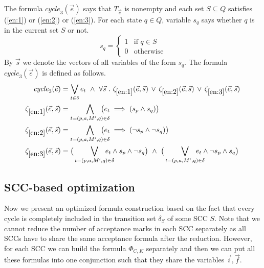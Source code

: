 \documentclass[a4paper,UKenglish,cleveref, autoref, thm-restate]{lipics-v2021}
\newcommand{\mcycle}{\mathit{cycle}}
\newcommand{\Te}{T_{\vec{e}}}
\begin{document}
The formula $\mcycle_3(\vec{e})$ says that $\Te$ is nonempty and each
set $S\subseteq Q$ satisfies (\ref{en:1}) or (\ref{en:2}) or
(\ref{en:3}).  For each state $q\in Q$, variable $s_q$ says whether
$q$ is in the current set $S$ or not.
\[s_q=\left\{
    \begin{array}{ll}
      1 & \textrm{if }q\in S\\
      0 & \textrm{otherwise}    
    \end{array}\right.
\]
By $\vec{s}$ we denote the vectors of all variables of the form $s_q$.
The formula $\mcycle_3(\vec{e})$ is defined as follows.
\begin{align*}
  \mcycle_3(\vec{e})
  &=\bigvee_{t\in\delta}e_t~\wedge~\forall\vec{s}~.~\zeta_{\ref{en:1}}(\vec{e},\vec{s})\,\vee\,
    \zeta_{\ref{en:2}}(\vec{e},\vec{s})\,\vee\,
    \zeta_{\ref{en:3}}(\vec{e},\vec{s})\\ %
  \zeta_{\ref{en:1}}(\vec{e},\vec{s}) &= \bigwedge_{t=(p,a,M',q)\in\delta}\hspace{-5mm}\big(e_t\implies (s_p\wedge s_q)\big)\\
  \zeta_{\ref{en:2}}(\vec{e},\vec{s}) &= \bigwedge_{t=(p,a,M',q)\in\delta}\hspace{-5mm}\big(e_t\implies (\neg s_p\wedge \neg s_q)\big)\\
  \zeta_{\ref{en:3}}(\vec{e},\vec{s}) &= \big(\bigvee_{t=(p,a,M',q)\in\delta}\hspace{-5mm}e_t\wedge s_p\wedge \neg s_q\big) ~\wedge~
  \big(\bigvee_{t=(p,a,M',q)\in\delta}\hspace{-5mm}e_t\wedge \neg s_p\wedge s_q\big)
\end{align*}

\subsection{SCC-based optimization}

Now we present an optimized formula construction based on the fact
that every cycle is completely included in the transition set
$\delta_S$ of some SCC $S$. Note that we cannot reduce the number of
acceptance marks in each SCC separately as all SCCs have to share the
same acceptance formula after the reduction. However, for each SCC we
can build the formula $\Phi_{C,K}$ separately and then we can put all
these formulas into one conjunction such that they share the variables
$\vec{i},\vec{f}$.
\end{document}
